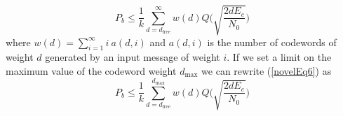 \begin{equation}
P_b \leq \frac{1}{k} \sum_{d=d_{\text{free}}}^{\infty} w(d) Q\Bigg( \sqrt{\frac{2dE_c}{N_0}}\Bigg)
\label{novelEq6}
\end{equation}
where $w(d)=\sum_{i=1}^{\infty} i~ a(d,i)$ and $ a(d,i)$ is the number of codewords of weight $d$ generated by an input message of weight $i$. If we set a limit on the maximum value of the codeword weight $d_{\text{max}}$
 we can rewrite (\ref{novelEq6}) as 
\begin{equation}
P_b \leq \frac{1}{k} \sum_{d=d_{\text{free}}}^{d_{\text{max}}} w(d) Q\Bigg( \sqrt{\frac{2dE_c}{N_0}}\Bigg)
\label{novelEq7}
\end{equation}



